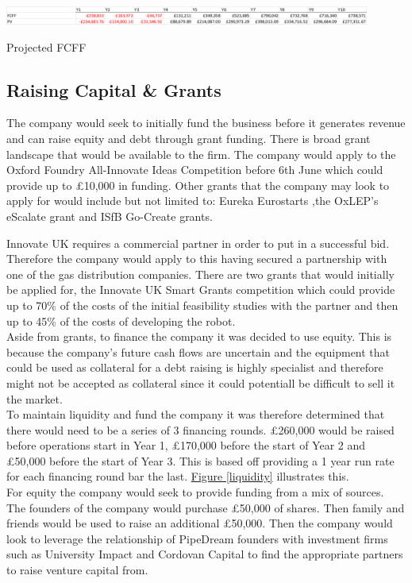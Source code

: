 \documentclass[11pt]{article}		%
\newcommand{\figref}[1]{\hyperref[#1]{Figure \ref*{#1}}}    %
\begin{document}
		 		\begin{table}[H]
					\centering
					\includegraphics[width=0.9\textwidth]{FCFF_v1}
					\caption{Projected FCFF}
					\label{forecast_FCF}
				\end{table}
				
			 
			    
			    
			     \subsection{Raising Capital \& Grants} \label{raisingFunds}
		  
		  The company would seek to initially fund the business before it generates revenue and can raise equity and debt through grant funding. There is broad grant landscape that would be available to the firm. The company would apply to the Oxford Foundry All-Innovate Ideas Competition before 6th June which could provide up to £10,000 in funding.  Other grants that the company may look to apply for would include but not limited to: Eureka Eurostarts  ,the OxLEP’s eScalate grant  and ISfB Go-Create grants.
            
        Innovate UK requires a commercial partner in order to put in a successful bid. Therefore the company would apply to this having secured a partnership with one of the gas distribution companies. There are two grants that would initially be applied for, the Innovate UK Smart Grants competition which could provide up to 70\% of the costs of the initial feasibility studies with the partner and then up to 45\% of the costs of developing the robot.
          \\ 
			    Aside from grants, to finance the company it was decided to use equity. This is because the company's future cash flows are uncertain and the equipment that could be used as collateral for a debt raising is highly specialist and therefore might not be accepted as collateral since it could potentiall be difficult to sell it the market.
			    \\
			    To maintain liquidity and fund the company it was therefore determined that there would need to be a series of 3 financing rounds. £260,000 would be raised before operations start in Year 1, £170,000 before the start of Year 2 and £50,000 before the start of Year 3. This is based off providing a 1 year run rate for each financing round bar the last. \figref{liquidity} illustrates this. 
			 \\   
            For equity the company would seek to provide funding from a mix of sources. The founders of the company would purchase £50,000 of shares. Then family and friends would be used to raise an additional £50,000. Then the company would look to leverage the relationship of PipeDream founders with investment firms such as University Impact  and Cordovan Capital to find the appropriate partners to raise venture capital from.
            
\end{document}
